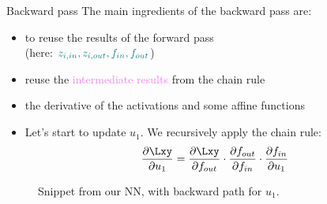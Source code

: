 \begin{vbframe}{Backward pass}
   The main ingredients of the backward pass are: 
    \begin{itemize}
      \item to reuse the results of the forward pass \\ (here:  $\textcolor{teal}{z_{i, in}, z_{i, out}, f_{in},f_{out}}$)
      \item reuse the \textcolor{violet}{intermediate results} from the chain rule 
      \item the derivative of the activations and some affine functions
    \end{itemize}
\framebreak

  \begin{itemize}
    \item Let's start to update $u_1$. We recursively apply the chain rule: $$\frac{\partial \Lxy}{\partial u_1} = \frac{\partial \Lxy}{\partial f_{out}} \cdot \frac{\partial f_{out}}{\partial f_{in}} \cdot \frac{\partial f_{in}}{\partial u_1}$$
  \end{itemize}
  \begin{figure}
    \centering
      \caption{\footnotesize{Snippet from our NN, with backward path for $u_1$.}}
  \end{figure}
\framebreak


\end{vbframe}
